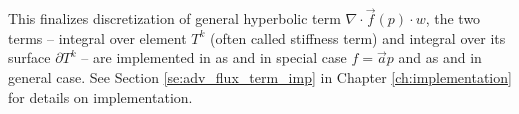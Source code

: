 This finalizes discretization of general hyperbolic term 
$\nabla\cdot\vec{f}(p) 
\cdot w$, the two terms -- integral over element $T^k$ (often called stiffness 
term) and integral over its surface $\partial T^k$ -- are implemented in \sfepy{} 
as  and  in special 
case $f = \vec{a}p$ and as  and 
 in general case. See Section 
\ref{se:adv_flux_term_imp} in Chapter \ref{ch:implementation} for details on 
implementation.





